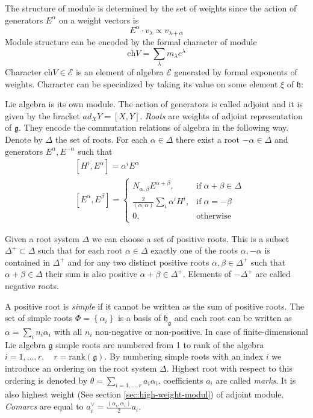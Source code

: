 \documentclass[preprint,12pt]{elsarticle}
\newcommand{\gf}{\mathfrak{g}}
\newcommand{\hf}{\mathfrak{h}}
\newcommand{\hfg}{\hf_{\gf}}
\begin{document}
The structure of module is determined by the set of weights since the action of generators $E^{\alpha}$ on a weight vectors is
\begin{equation}
  \label{eq:5}
  E^{\alpha}\cdot v_{\lambda} \propto v_{\lambda+\alpha}
\end{equation}
Module structure can be encoded by the formal character of module
\begin{equation}
  \label{eq:10}
  \mathrm{ch}V=\sum_{\lambda}m_{\lambda} e^{\lambda}
\end{equation}
Character  $\mathrm{ch}V\in \mathcal{E}$ is an element of algebra $\mathcal{E}$ generated by formal exponents of weights.
Character can be specialized by taking its value on some element $\xi$ of $\hf$:

Lie algebra is its own module. The action of generators is called adjoint and it is given by the bracket $ad_{X} Y=[X,Y]$. 
{\it Roots} are weights of adjoint representation of $\gf$. They encode the commutation relations of algebra in the following way. Denote by $\Delta$ the set of roots. For each $\alpha\in \Delta$ there exist a root $-\alpha\in \Delta$ and generators $E^{\alpha}, E^{-\alpha}$ such that
\begin{align}
  \label{eq:4}
  &  [H^{i},E^{\alpha}]=\alpha^{i}E^{\alpha} \\
  &\left[E^{\alpha},E^{\beta}\right]=
  \begin{cases}
    N_{\alpha,\beta} E^{\alpha+\beta}, & \mbox{if}\; \alpha+\beta\in \Delta\\
    \frac{2}{(\alpha,\alpha)} \sum_{i}\alpha^{i} H^{i},&  \mbox{if}\; \alpha=-\beta\\
    0,&\mbox{otherwise}
  \end{cases}
\end{align}

Given a root system $\Delta$ we can choose a set of positive roots. This is a subset  $\Delta^{+}\subset \Delta$ such that for each root $\alpha\in\Delta$ exactly one of the roots $\alpha, -\alpha$ is contained in $\Delta^{+}$ and for any two distinct positive roots $\alpha, \beta\in \Delta^{+}$ such that $\alpha+\beta\in \Delta$ their sum is also positive $\alpha+\beta\in\Delta^{+}$.
Elements of $-\Delta^{+}$ are called negative roots.

A positive root is {\it simple} if it cannot be written as the sum of positive roots. The set of simple roots $\Phi=\left\{\alpha_{i}\right\}$ is a basis of $\hfg$ and each root can be written as $\alpha=\sum_{i}n_{i}\alpha_{i}$ with all $n_{i}$ non-negative or non-positive. In case of finite-dimensional Lie algebra $\gf$ simple roots are numbered from 1 to rank of the algebra $i=1,\dots,r,\quad r=\mathrm{rank}(\gf)$. By numbering simple roots with an index $i$ we introduce an ordering on the root system $\Delta$. Highest root with respect to this ordering is denoted by  $\theta=\sum_{i=1,\dots,r} a_i \alpha_i$, coefficients $a_i$ are called {\it marks}. It is also highest weight (See section \ref{sec:high-weight-modul}) of adjoint module. {\it Comarcs} are equal to $a_i^{\vee}=\frac{(\alpha_i,\alpha_i)}{2} a_i$.
\end{document}
